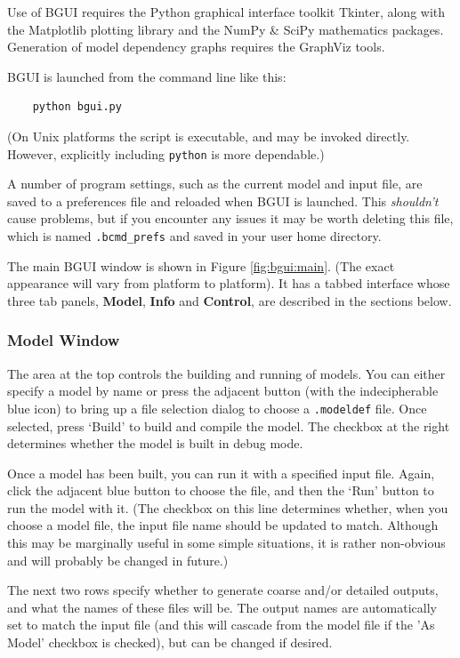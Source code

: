 \documentclass[a4paper,11pt]{article}
\begin{document}
Use of BGUI requires the Python graphical interface toolkit Tkinter, along with the Matplotlib plotting library and the NumPy \& SciPy mathematics packages. Generation of model dependency graphs requires the GraphViz tools.

BGUI is launched from the command line like this:
\begin{verbatim}
    python bgui.py
\end{verbatim}
(On Unix platforms the script is executable, and may be invoked directly. However, explicitly including \texttt{python} is more dependable.)

A number of program settings, such as the current model and input file, are saved to a preferences file and reloaded when BGUI is launched. This \textit{shouldn't} cause problems, but if you encounter any issues it may be worth deleting this file, which is named \texttt{.bcmd\_prefs} and saved in your user home directory.

The main BGUI window is shown in Figure \ref{fig:bgui:main}. (The exact appearance will vary from platform to platform). It has a tabbed interface whose three tab panels, \textbf{Model}, \textbf{Info} and \textbf{Control}, are described in the sections below.

\subsubsection{Model Window}\label{bgui:model}
The area at the top controls the building and running of models. You can either specify a model by name or press the adjacent button (with the indecipherable blue icon) to bring up a file selection dialog to choose a \texttt{.modeldef} file. Once selected, press `Build' to build and compile the model. The checkbox at the right determines whether the model is built in debug mode.

Once a model has been built, you can run it with a specified input file. Again, click the adjacent blue button to choose the file, and then the `Run' button to run the model with it. (The checkbox on this line determines whether, when you choose a model file, the input file name should be updated to match. Although this may be marginally useful in some simple situations, it is rather non-obvious and will probably be changed in future.)

The next two rows specify whether to generate coarse and/or detailed outputs, and what the names of these files will be. The output names are automatically set to match the input file (and this will cascade from the model file if the 'As Model' checkbox is checked), but can be changed if desired.
\end{document}
